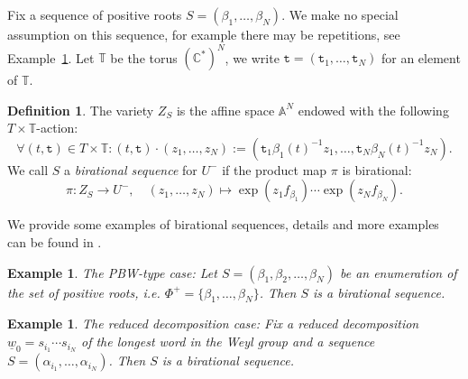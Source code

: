 \documentclass{emsprocart}
\newtheorem{exam}[theorem]{Example}
\theoremstyle{definition}
\newtheorem{definition}[theorem]{Definition}
\begin{document}
Fix a sequence of positive roots $S=({\beta_1},\ldots,{\beta_N})$.
We make no special assumption on this sequence, for example there may be repetitions, see
Example~\ref{monomialszwo}. Let $\mathbb T$ be the torus $(\mathbb C^*)^N$,
we write $\texttt{t}=(\texttt{t}_1,\ldots,\texttt{t}_N)$ for an element of $\mathbb T$.
\begin{definition} \label{orderedgenerating}
The variety ${Z}_S$ is the affine space $\mathbb A^N$ endowed with the following $T\times\mathbb T$-action:
$$
\forall (t,\texttt{t})\in T\times \mathbb T:(t,\texttt{t})\cdot(z_1,\ldots,z_N):=
(\texttt{t}_1 \beta_1(t)^{-1}z_1,\ldots, \texttt{t}_N \beta_N(t)^{-1}z_N).
$$
We call $S$  a {\it birational sequence} for $U^-$ if the product map $\pi$ is birational:
\begin{equation}\label{birational1}
\pi:Z_S\rightarrow U^-,\quad (z_1,\ldots,z_N)\mapsto \exp(z_1f_{\beta_1})\cdots \exp(z_Nf_{\beta_N}).
\end{equation}
\end{definition}

We provide some examples of birational sequences, details and more examples can be found in \cite{FaFL}.

\begin{exam}\label{monomialseins} {\it The PBW-type case\/}: \rm
Let $S=({\beta_1},\beta_2,\ldots,{\beta_N})$ be an enumeration of the set of positive roots,
i.e. $\Phi^+=\{\beta_1,\ldots,\beta_N\}$. Then $S$ is a birational sequence.
\end{exam}
\begin{exam}
\label{monomialszwo} {\it The reduced decomposition case\/}: \rm
Fix a reduced decomposition $\underline{w}_0=s_{i_1}\cdots s_{i_N}$ of the longest word in the Weyl group and
a sequence $S=({\alpha_{i_1}},\ldots, {\alpha_{i_N}})$. Then $S$ is a birational sequence.
\end{exam}
\end{document}
